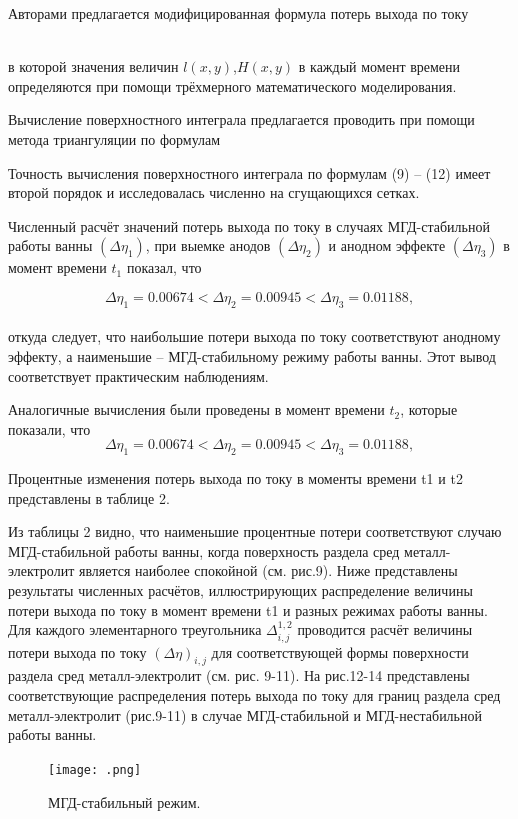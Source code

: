 \documentclass{article}
\begin{document}
Авторами предлагается модифицированная формула потерь выхода по току 

%
\\
в которой значения величин $l(x,y)$,$ H(x,y)$ в каждый момент времени определяются при помощи трёхмерного математического моделирования.

Вычисление поверхностного интеграла предлагается проводить при помощи метода триангуляции по формулам 

%

Точность вычисления поверхностного интеграла по формулам (9) – (12) имеет второй порядок и исследовалась численно на сгущающихся сетках.

Численный расчёт значений потерь выхода по току в случаях МГД-стабильной работы ванны $(\Delta\eta_1)$, при выемке анодов $(\Delta\eta_2)$ и анодном эффекте $(\Delta\eta_3)$ в момент времени $t_1$ показал, что 

\[ \Delta\eta_1 = 0.00674 < \Delta\eta_2 = 0.00945 < \Delta\eta_3 = 0.01188, \]
\\
откуда следует, что наибольшие потери выхода по току соответствуют анодному эффекту, а наименьшие – МГД-стабильному режиму работы ванны. Этот вывод соответствует практическим наблюдениям.

Аналогичные вычисления были проведены в момент времени $t_2$, которые показали, что
\[ \Delta\eta_1 = 0.00674 < \Delta\eta_2 = 0.00945 < \Delta\eta_3 = 0.01188, \]

Процентные изменения потерь выхода по току в моменты времени t1 и t2 представлены в таблице 2. 


Из таблицы 2 видно, что наименьшие процентные потери соответствуют случаю МГД-стабильной работы ванны, когда поверхность раздела сред металл-электролит является наиболее спокойной (см. рис.9).
Ниже представлены результаты численных расчётов, иллюстрирующих распределение величины потери выхода по току в момент времени t1 и разных режимах работы ванны. Для каждого элементарного треугольника $\Delta^{1,2}_{i,j}$ проводится расчёт величины потери выхода по току $(\Delta\eta)_{i,j}$ для соответствующей формы поверхности раздела сред металл-электролит (см. рис. 9-11). На рис.12-14 представлены соответствующие распределения потерь выхода по току для границ раздела сред металл-электролит (рис.9-11) в случае МГД-стабильной и МГД-нестабильной работы ванны. 

\begin{figure}[h!]
    \centering
    \texttt{[image: .png]}
    \caption{МГД-стабильный режим.}
    \label{fig:} 
\end{figure}
\end{document}
